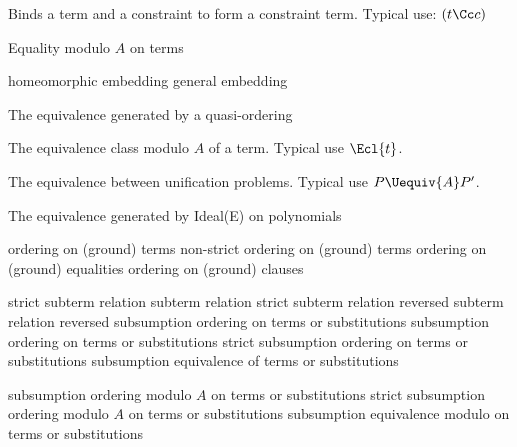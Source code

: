 
         {Binds a term and a constraint to form a constraint term.
          Typical use: $(t \Cc c)$}

         {Equality modulo $A$ on terms}

         {homeomorphic embedding}
         {general embedding}

         {The equivalence generated by a quasi-ordering}

         {The equivalence class modulo $A$ of a term. 
          Typical use $\Ecl{t}$.}

         {The equivalence between unification problems. Typical use
         $P\Uequiv{A}P'$.}

         {The equivalence generated by Ideal(E) on polynomials}

         {ordering on (ground) terms}
         {non-strict ordering on (ground) terms}
         {ordering on (ground) equalities}
         {ordering on (ground) clauses}

         {strict subterm relation}
         {subterm relation}
         {strict subterm relation reversed}
         {subterm relation reversed}
         {subsumption ordering on terms or substitutions}
         {subsumption ordering on terms or substitutions}
         {strict subsumption ordering on terms or substitutions}
         {subsumption equivalence of terms or substitutions}

         {subsumption ordering modulo $A$ on terms or substitutions}
         {strict subsumption ordering modulo $A$ on terms or substitutions}
         {subsumption equivalence modulo on terms or substitutions}


